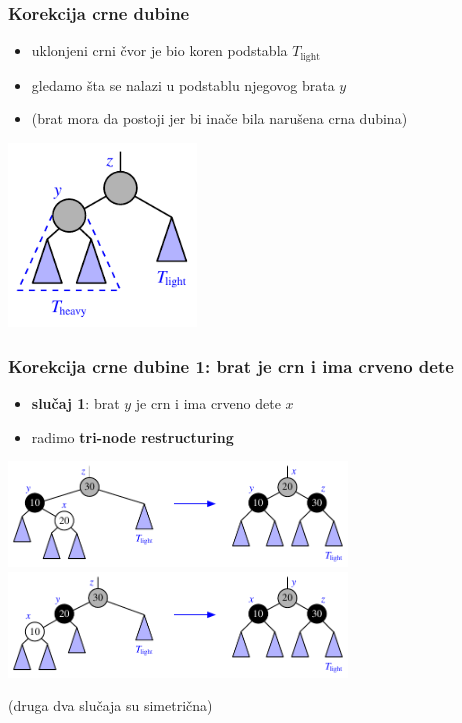 \documentclass[compress]{beamer}
\begin{document}
\begin{frame}[fragile]
  \frametitle{Korekcija crne dubine}
  \begin{itemize}
    \item uklonjeni crni čvor je bio koren podstabla $T_{\text{light}}$
    \item gledamo šta se nalazi u podstablu njegovog brata $y$ 
    \item (brat mora da postoji jer bi inače bila narušena crna dubina)
  \end{itemize}
  \begin{center}
    \includegraphics[width=5cm]{asp-11-pic41.pdf}
  \end{center}
\end{frame}

\begin{frame}[fragile]
  \frametitle{Korekcija crne dubine 1: brat je crn i ima crveno dete}
  \begin{itemize}
    \item \textbf{slučaj 1}: brat $y$ je crn i ima crveno dete $x$
    \item radimo \textbf{tri-node restructuring}
  \end{itemize}
  \begin{center}
    \includegraphics[width=9cm]{asp-11-pic42a.pdf} \\
    \includegraphics[width=9cm]{asp-11-pic42b.pdf} \\
  \end{center}
  {\scriptsize (druga dva slučaja su simetrična)}
\end{frame}
\end{document}
